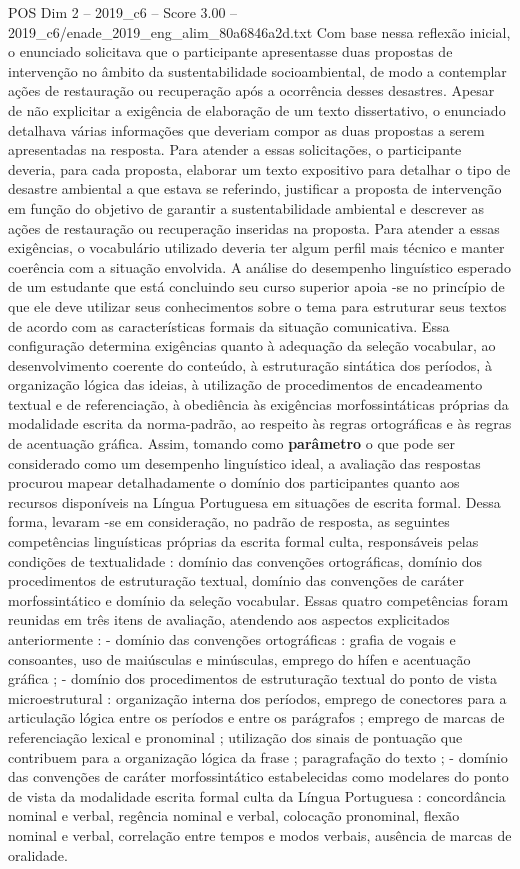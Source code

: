\begin{textsample}{POS Dim 2 – 2019\_c6 – Score 3.00 – 2019\_c6/enade\_2019\_eng\_alim\_80a6846a2d.txt}
Com base nessa reflexão inicial, o enunciado solicitava que o participante apresentasse duas propostas de intervenção no âmbito da sustentabilidade socioambiental, de modo a contemplar ações de restauração ou recuperação após a ocorrência desses desastres.
Apesar de não explicitar a exigência de elaboração de um texto dissertativo, o enunciado detalhava várias informações que deveriam compor as duas propostas a serem apresentadas na resposta.
Para atender a essas solicitações, o participante deveria, para cada proposta, elaborar um texto expositivo para detalhar o tipo de desastre ambiental a que estava se referindo, justificar a proposta de intervenção em função do objetivo de garantir a sustentabilidade ambiental e descrever as ações de restauração ou recuperação inseridas na proposta.
Para atender a essas exigências, o vocabulário utilizado deveria ter algum perfil mais técnico e manter coerência com a situação envolvida.
A análise do desempenho linguístico esperado de um estudante que está concluindo seu curso superior apoia -se no princípio de que ele deve utilizar seus conhecimentos sobre o tema para estruturar seus textos de acordo com as características formais da situação comunicativa.
Essa configuração determina exigências quanto à adequação da seleção vocabular, ao desenvolvimento coerente do conteúdo, à estruturação sintática dos períodos, à organização lógica das ideias, à utilização de procedimentos de encadeamento textual e de referenciação, à obediência às exigências morfossintáticas próprias da modalidade escrita da norma-padrão, ao respeito às regras ortográficas e às regras de acentuação gráfica.
Assim, tomando como \textbf{parâmetro} o que pode ser considerado como um desempenho linguístico ideal, a avaliação das respostas procurou mapear detalhadamente o domínio dos participantes quanto aos recursos disponíveis na Língua Portuguesa em situações de escrita formal.
Dessa forma, levaram -se em consideração, no padrão de resposta, as seguintes competências linguísticas próprias da escrita formal culta, responsáveis pelas condições de textualidade : domínio das convenções ortográficas, domínio dos procedimentos de estruturação textual, domínio das convenções de caráter morfossintático e domínio da seleção vocabular.
Essas quatro competências foram reunidas em três itens de avaliação, atendendo aos aspectos explicitados anteriormente : - domínio das convenções ortográficas : grafia de vogais e consoantes, uso de maiúsculas e minúsculas, emprego do hífen e acentuação gráfica ; - domínio dos procedimentos de estruturação textual do ponto de vista microestrutural : organização interna dos períodos, emprego de conectores para a articulação lógica entre os períodos e entre os parágrafos ; emprego de marcas de referenciação lexical e pronominal ; utilização dos sinais de pontuação que contribuem para a organização lógica da frase ; paragrafação do texto ; - domínio das convenções de caráter morfossintático estabelecidas como modelares do ponto de vista da modalidade escrita formal culta da Língua Portuguesa : concordância nominal e verbal, regência nominal e verbal, colocação pronominal, flexão nominal e verbal, correlação entre tempos e modos verbais, ausência de marcas de oralidade.

\end{textsample}

